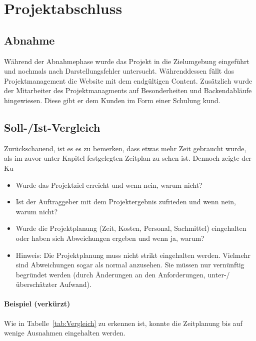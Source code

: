 \section{Projektabschluss} 
\label{sec:Projektabschluss}

\subsection{Abnahme} 
\label{sec:Abnahme}
Während der Abnahmephase wurde das Projekt in die Zielumgebung eingeführt und
nochmals nach Darstellungsfehler untersucht. Währenddessen füllt das
Projektmanagement die Website mit dem endgültigen Content. Zusätzlich wurde der
Mitarbeiter des Projektmanagments auf Besonderheiten und Backendabläufe
hingewiesen. Diese gibt er dem Kunden im Form einer Schulung kund.

\subsection{Soll-/Ist-Vergleich}
\label{sec:SollIstVergleich}

Zurückschauend, ist es es zu bemerken, dass etwas mehr Zeit gebraucht wurde,
als im zuvor unter \xx Kapitel festgelegten Zeitplan zu sehen ist. Dennoch
zeigte der Ku
\begin{itemize}
	\item Wurde das Projektziel erreicht und wenn nein, warum nicht?
	\item Ist der Auftraggeber mit dem Projektergebnis zufrieden und wenn nein, warum nicht?
	\item Wurde die Projektplanung (Zeit, Kosten, Personal, Sachmittel) eingehalten oder haben sich Abweichungen ergeben und wenn ja, warum?
	\item Hinweis: Die Projektplanung muss nicht strikt eingehalten werden. Vielmehr sind Abweichungen sogar als normal anzusehen. Sie müssen nur vernünftig begründet werden (\zB durch Änderungen an den Anforderungen, unter-/überschätzter Aufwand).
\end{itemize}

\paragraph{Beispiel (verkürzt)}
Wie in Tabelle~\ref{tab:Vergleich} zu erkennen ist, konnte die Zeitplanung bis auf wenige Ausnahmen eingehalten werden.

